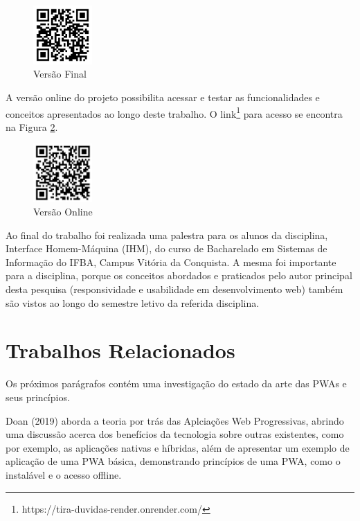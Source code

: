 \documentclass[12pt]{article}
\begin{document}
\begin{figure}[ht!]
\centering
\includegraphics[width=0.2\textwidth]{imagens/versao_final.jpg}
\caption{Versão Final}
\label{fig:versao_final}
\end{figure}

A versão online do projeto possibilita acessar e testar as funcionalidades e conceitos apresentados ao longo deste trabalho. O link\footnote{https://tira-duvidas-render.onrender.com/} para acesso se encontra na Figura \ref{fig:pwa_online}.

\begin{figure}[ht!]
\centering
\includegraphics[width=0.2\textwidth]{imagens/pwa_online.jpg}
\caption{Versão Online}
\label{fig:pwa_online}
\end{figure}

Ao final do trabalho foi realizada uma palestra para os alunos da disciplina, Interface Homem-Máquina (IHM), do curso de Bacharelado em Sistemas de Informação do IFBA, Campus Vitória da Conquista. A mesma foi importante para a disciplina, porque os conceitos abordados e praticados pelo autor principal desta pesquisa (responsividade e usabilidade em desenvolvimento web) também são vistos ao longo do semestre letivo da referida disciplina.

\section{Trabalhos Relacionados} \label{sec:correlatos}

Os próximos parágrafos contém uma investigação do estado da arte das PWAs e seus princípios.

Doan (2019) aborda a teoria por trás das Aplciações Web Progressivas, abrindo uma discussão acerca dos benefícios da tecnologia sobre outras existentes, como por exemplo, as aplicações nativas e híbridas, além de apresentar um exemplo de aplicação de uma PWA básica, demonstrando princípios de uma PWA, como o instalável e o acesso offline.
\end{document}
